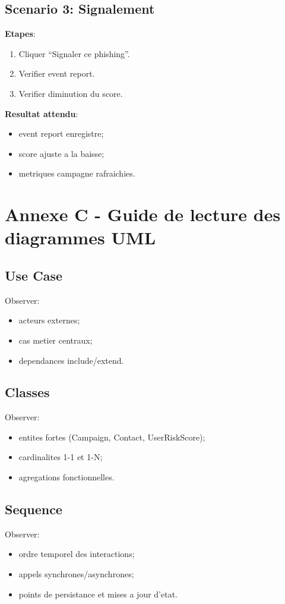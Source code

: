 \documentclass[12pt,a4paper,oneside]{report}
\begin{document}
\section*{Scenario 3: Signalement}
\textbf{Etapes}:
\begin{enumerate}[leftmargin=1.2cm]
  \item Cliquer ``Signaler ce phishing''.
  \item Verifier event report.
  \item Verifier diminution du score.
\end{enumerate}

\textbf{Resultat attendu}:
\begin{itemize}[leftmargin=1.2cm]
  \item event report enregistre;
  \item score ajuste a la baisse;
  \item metriques campagne rafraichies.
\end{itemize}

\chapter{Annexe C - Guide de lecture des diagrammes UML}
\section*{Use Case}
Observer:
\begin{itemize}[leftmargin=1.2cm]
  \item acteurs externes;
  \item cas metier centraux;
  \item dependances include/extend.
\end{itemize}

\section*{Classes}
Observer:
\begin{itemize}[leftmargin=1.2cm]
  \item entites fortes (Campaign, Contact, UserRiskScore);
  \item cardinalites 1-1 et 1-N;
  \item agregations fonctionnelles.
\end{itemize}

\section*{Sequence}
Observer:
\begin{itemize}[leftmargin=1.2cm]
  \item ordre temporel des interactions;
  \item appels synchrones/asynchrones;
  \item points de persistance et mises a jour d'etat.
\end{itemize}
\end{document}
